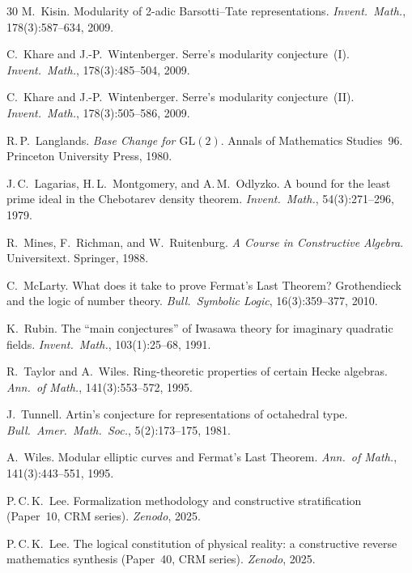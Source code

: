\documentclass[11pt]{article}
\theoremstyle{plain}
\theoremstyle{definition}
\theoremstyle{remark}
\begin{document}
\begin{thebibliography}{30}
M.~Kisin.
\newblock Modularity of 2-adic Barsotti--Tate representations.
\newblock \textit{Invent.\ Math.}, 178(3):587--634, 2009.

C.~Khare and J.-P.~Wintenberger.
\newblock Serre's modularity conjecture~(I).
\newblock \textit{Invent.\ Math.}, 178(3):485--504, 2009.

C.~Khare and J.-P.~Wintenberger.
\newblock Serre's modularity conjecture~(II).
\newblock \textit{Invent.\ Math.}, 178(3):505--586, 2009.

R.\,P.~Langlands.
\newblock \textit{Base Change for $\mathrm{GL}(2)$}.
\newblock Annals of Mathematics Studies~96.
Princeton University Press, 1980.

J.\,C.~Lagarias, H.\,L.~Montgomery, and A.\,M.~Odlyzko.
\newblock A bound for the least prime ideal in the Chebotarev
density theorem.
\newblock \textit{Invent.\ Math.}, 54(3):271--296, 1979.

R.~Mines, F.~Richman, and W.~Ruitenburg.
\newblock \textit{A Course in Constructive Algebra}.
\newblock Universitext. Springer, 1988.

C.~McLarty.
\newblock What does it take to prove Fermat's Last Theorem?
Grothendieck and the logic of number theory.
\newblock \textit{Bull.\ Symbolic Logic}, 16(3):359--377, 2010.

K.~Rubin.
\newblock The ``main conjectures'' of Iwasawa theory for imaginary
quadratic fields.
\newblock \textit{Invent.\ Math.}, 103(1):25--68, 1991.

R.~Taylor and A.~Wiles.
\newblock Ring-theoretic properties of certain Hecke algebras.
\newblock \textit{Ann.\ of Math.}, 141(3):553--572, 1995.

J.~Tunnell.
\newblock Artin's conjecture for representations of octahedral type.
\newblock \textit{Bull.\ Amer.\ Math.\ Soc.}, 5(2):173--175, 1981.

A.~Wiles.
\newblock Modular elliptic curves and Fermat's Last Theorem.
\newblock \textit{Ann.\ of Math.}, 141(3):443--551, 1995.

P.\,C.\,K.~Lee.
\newblock Formalization methodology and constructive stratification
(Paper~10, CRM series).
\newblock \textit{Zenodo}, 2025.

P.\,C.\,K.~Lee.
\newblock The logical constitution of physical reality:
a constructive reverse mathematics synthesis
(Paper~40, CRM series).
\newblock \textit{Zenodo}, 2025.


\end{thebibliography}
\end{document}

